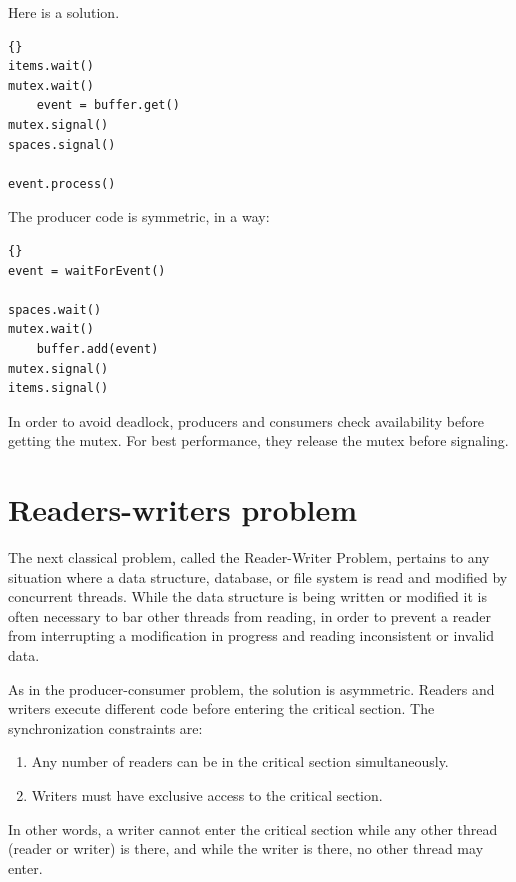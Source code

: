 \documentclass{book}
\begin{document}
Here is a solution.

\begin{lstlisting}[caption={Finite buffer consumer solution}]{}
items.wait()
mutex.wait()
    event = buffer.get()
mutex.signal()
spaces.signal()

event.process()
\end{lstlisting}

The producer code is symmetric, in a way:

\begin{lstlisting}[caption={Finite buffer producer solution}]{}
event = waitForEvent()

spaces.wait()
mutex.wait()
    buffer.add(event)
mutex.signal()
items.signal()
\end{lstlisting}

In order to avoid deadlock, producers and consumers check
availability before getting the mutex.  For best performance,
they release the mutex before signaling.


\section{Readers-writers problem} 

The next classical problem, called the Reader-Writer Problem, pertains
to any situation where a data structure, database, or file system is
read and modified by concurrent threads.  While the data structure is
being written or modified it is often necessary to bar other threads
from reading, in order to prevent a reader from interrupting a
modification in progress and reading inconsistent or invalid data.

As in the producer-consumer problem, the solution is asymmetric.
Readers and writers execute different code before entering the
critical section.  The synchronization constraints are:

\begin{enumerate}

\item Any number of readers can be in the critical section
simultaneously.

\item Writers must have exclusive access to the critical section.

\end{enumerate}

In other words, a writer cannot enter the critical section while
any other thread (reader or writer) is there, and while the writer
is there, no other thread may enter.
\end{document}
